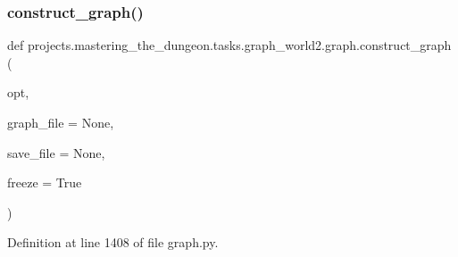 \subsubsection{\texorpdfstring{construct\+\_\+graph()}{construct\_graph()}}
{\footnotesize\ttfamily def projects.\+mastering\+\_\+the\+\_\+dungeon.\+tasks.\+graph\+\_\+world2.\+graph.\+construct\+\_\+graph (\begin{DoxyParamCaption}\item[{}]{opt,  }\item[{}]{graph\+\_\+file = {\ttfamily None},  }\item[{}]{save\+\_\+file = {\ttfamily None},  }\item[{}]{freeze = {\ttfamily True} }\end{DoxyParamCaption})}



Definition at line 1408 of file graph.\+py.



